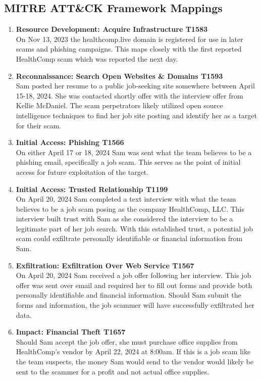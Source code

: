 \begin{fullwidth}
\subsection{MITRE ATT\&CK Framework Mappings}

\begin{enumerate}
    \item \textbf{Resource Development: Acquire Infrastructure T1583}
        \\\medskip On Nov 13, 2023 the healthcomp.live domain is registered for use in later scams and phishing campaigns. This maps closely with the first reported HealthComp scam which was reported the next day.
    \item \textbf{Reconnaissance: Search Open Websites \& Domains T1593}
        \\\medskip Sam posted her resume to a public job-seeking site somewhere between April 15-18, 2024. She was contacted shortly offer with the interview offer from Kellie McDaniel. The scam perpetrators likely utilized open source intelligence techniques to find her job site posting and identify her as a target for their scam.
    \item \textbf{Initial Access: Phishing T1566}
        \\\medskip On either April 17 or 18, 2024 Sam was sent what the team believes to be a phishing email, specifically a job scam. This serves as the point of initial access for future exploitation of the target.
    \item \textbf{Initial Access: Trusted Relationship T1199}
        \\\medskip On April 20, 2024 Sam completed a text interview with what the team believes to be a job scam posing as the company HealthComp, LLC. This interview built trust with Sam as she considered the interview to be a legitimate part of her job search. With this established trust, a potential job scam could exfiltrate personally identifiable or financial information from Sam.
    \item \textbf{Exfiltration: Exfiltration Over Web Service T1567}
        \\\medskip On April 20, 2024 Sam received a job offer following her interview. This job offer was sent over email and required her to fill out forms and provide both personally identifiable and financial information. Should Sam submit the forms and information, the job scammer will have successfully exfiltrated her data.
    \item \textbf{Impact: Financial Theft T1657}
        \\\medskip Should Sam accept the job offer, she must purchase office supplies from HealthComp's vendor by April 22, 2024 at 8:00am. If this is a job scam like the team suspects, the money Sam would send to the vendor would likely be sent to the scammer for a profit and not actual office supplies.
\end{enumerate}

\end{fullwidth}